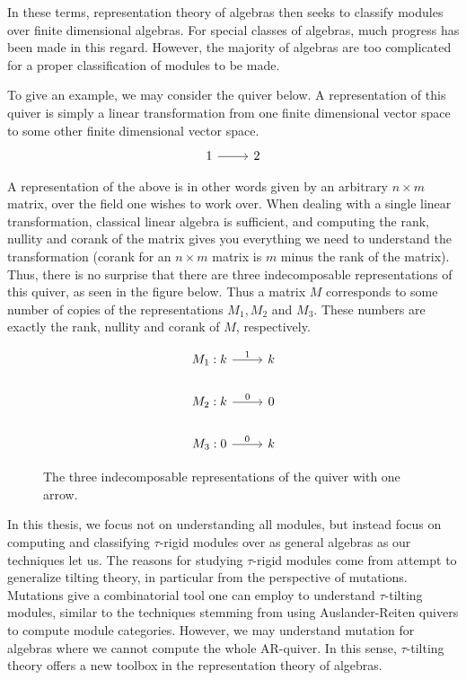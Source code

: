 \documentclass[]{article}
\theoremstyle{definition}
\newcommand{\tu}{\ensuremath{\tau}}
\begin{document}
In these terms, representation theory of algebras then seeks to classify modules over finite dimensional algebras. For special classes of algebras, much progress has been made in this regard. However, the majority of algebras are too complicated for a proper classification of modules to be made.

To give an example, we may consider the quiver below. A representation of this quiver is simply a linear transformation from one finite dimensional vector space to some other finite dimensional vector space.
\[\begin{tikzcd}
	1 & 2
	\arrow[from=1-1, to=1-2]
\end{tikzcd}\]

A representation of the above is in other words given by an arbitrary $n \times m$ matrix, over the field one wishes to work over. When dealing with a single linear transformation, classical linear algebra is sufficient, and computing the rank, nullity and corank of the matrix gives you everything we need to understand the transformation (corank for an $n \times m$ matrix is $m$ minus the rank of the matrix). Thus, there is no surprise that there are three indecomposable representations of this quiver, as seen in the figure below. Thus a matrix $M$ corresponds to some number of copies of the representations $M_1,M_2$ and $M_3$. These numbers are exactly the rank, nullity and corank of $M$, respectively.

\begin{figure}[h]
	\[\begin{tikzcd}
		M_1: k & k \\
		M_2: k & 0 \\
		M_3: 0 & k
		\arrow[from=3-1, to=3-2,"0"]
		\arrow[from=2-1, to=2-2,"0"]
		\arrow[from=1-1, to=1-2,"1"]
	\end{tikzcd}\]
\caption{The three indecomposable representations of the quiver with one arrow.}

\end{figure}


In this thesis, we focus not on understanding all modules, but instead focus on computing and classifying \tu-rigid modules over as general algebras as our techniques let us. The reasons for studying \tu-rigid modules come from attempt to generalize tilting theory, in particular from the perspective of mutations. Mutations give a combinatorial tool one can employ to understand \tu-tilting modules, similar to the techniques stemming from using Auslander-Reiten quivers to compute module categories. However, we may understand mutation for algebras where we cannot compute the whole AR-quiver. In this sense, \tu-tilting theory offers a new toolbox in the representation theory of algebras.
\end{document}
